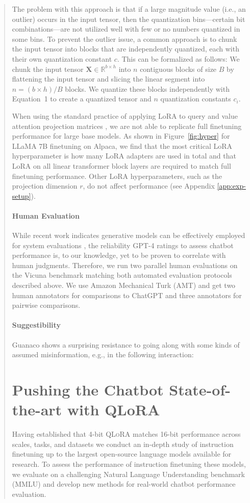 \begin{quote}
The problem with this approach is that if a large magnitude value (i.e., an outlier) occurs in the input tensor, then the quantization bins—certain bit combinations—are not utilized well with few or no numbers quantized in some bins. To prevent the outlier issue, a common approach is to chunk the input tensor into blocks that are independently quantized, each with their own quantization constant $c$. This can be formalized as follows: We chunk the input tensor  $\mathbf{X}\in \mathbb{R}^{b\times h}$ into $n$ contiguous blocks of size $B$ by flattening the input tensor and slicing the linear segment into ${n = ({b\times h} )/{B} }$ blocks. We quantize these blocks independently with Equation~1 to create a quantized tensor and $n$ quantization constants $c_i$.

When using the standard practice of applying LoRA to query and value attention projection matrices \citep{hu2021lora}, we are not able to replicate full finetuning performance for large base models. As shown in Figure~\ref{fig:hyper} for LLaMA 7B finetuning on Alpaca, we find that the most critical LoRA hyperparameter is how many LoRA adapters are used in total and that LoRA on all linear transformer block layers are required to match full finetuning performance. Other LoRA hyperparameters, such as the projection dimension $r$, do not affect performance (see Appendix \ref{app:exp-setup}). 

\paragraph{Human Evaluation} While recent work indicates generative models can be effectively employed for system evaluations \citep{fu2023gptscore}, the reliability GPT-4 ratings to assess chatbot performance is, to our knowledge, yet to be proven to correlate with human judgments. Therefore, we run two parallel human evaluations on the Vicuna benchmark matching both automated evaluation protocols described above. We use Amazon Mechanical Turk (AMT) and get two human annotators for comparisons to ChatGPT and three annotators for pairwise comparisons. 

\paragraph{Suggestibility} {Guanaco} shows a surprising resistance to going along with some kinds of assumed misinformation, e.g., in the following interaction:

\section{Pushing the Chatbot State-of-the-art with QLoRA}
\label{sec:pushing}
Having established that 4-bit \textsc{QLoRA} matches 16-bit performance across scales, tasks, and datasets we conduct an in-depth study of instruction finetuning up to the largest open-source language models available for research. To assess the performance of instruction finetuning these models, we evaluate on a challenging Natural Language Understanding benchmark (MMLU) and develop new methods for real-world  chatbot performance evaluation. 


\end{quote}
